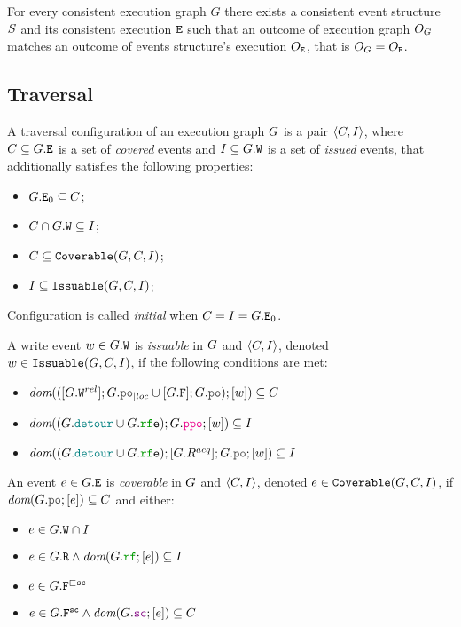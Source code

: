 \documentclass[12pt]{article}
\begin{document}
\begin{theorem}
  For every consistent \imm execution graph $G$
  there exists a consistent event structure $S$ and its consistent execution ${\mathtt{E}}$
  such that an outcome of execution graph $O_{G}$ matches
  an outcome of events structure's execution $O_{{\mathtt{E}}}$, 
  that is $O_{G} = O_{{\mathtt{E}}}$.
\end{theorem}

\subsection{Traversal}

\begin{definition}
  A traversal configuration of an execution graph $G$ is a pair $\langle C, I \rangle$, 
  where $C \subseteq G.{\mathtt{E}}$ is a set of \emph{covered} events 
  and $I \subseteq G.{\mathtt{W}}$ is a set of \emph{issued} events,
  that additionally satisfies the following properties:
  \begin{itemize}
    \item $G.{\mathtt{E}}_{0} \subseteq C$;
    \item $C \cap G.{\mathtt{W}} \subseteq I$;
    \item $C \subseteq {\mathtt{Coverable}}(G, C, I)$;
    \item $I \subseteq {\mathtt{Issuable}}(G, C, I)$;
  \end{itemize}
  Configuration is called \emph{initial} when $C = I = G.{\mathtt{E}}_{0}$.
\end{definition}

\begin{definition}
  A write event $w \in G.{\mathtt{W}}$ is \emph{issuable} in $G$ and $\langle C, I \rangle$,
  denoted $w \in {\mathtt{Issuable}}(G, C, I)$, 
  if the following conditions are met:
  \begin{itemize}
    \item $\dom{([\lG.\lW^{rel}];\lmakeLoc{\lG.\lPO} \cup [\lG.\lF];\lG.\lPO);[w]} \subseteq \lC$
    \item $\dom{(\lG.\lDETOUR \cup \lG.\lRFE);\lG.\lPPO;[w]} \subseteq \lI$
    \item $\dom{(\lG.\lDETOUR \cup \lG.\lRFE);[\lG.R^{acq}];\lG.\lPO;[w]} \subseteq \lI$
  \end{itemize}
\end{definition}

\begin{definition}
  An event $e \in G.{\mathtt{E}}$ is \emph{coverable} in $G$ and $\langle C, I \rangle$,
  denoted $e \in {\mathtt{Coverable}}(G, C, I)$, 
  if $\dom{\lG.\lPO;[e]} \subseteq \lC$ and either:
  \begin{itemize}
    \item $e \in G.{\mathtt{W}} \cap I$
    \item $e \in \lG.\lR \wedge \dom{\lG.\lRF;[e]} \subseteq I$
    \item $e \in G.{\mathtt{F}}^{\sqsubset{\mathtt{sc}}}$
    \item $e \in \lG.\lF^{\sco} \wedge \dom{\lG.\lSC;[e]} \subseteq \lC$
  \end{itemize}
\end{definition}
\end{document}
